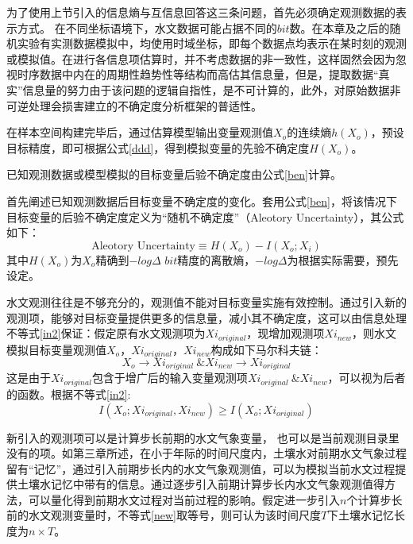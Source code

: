 为了使用上节引入的信息熵与互信息回答这三条问题，首先必须确定观测数据的表示方式。 在不同坐标语境下，水文数据可能占据不同的$bit$数。在本章及之后的随机实验有实测数据模拟中，均使用时域坐标，即每个数据点均表示在某时刻的观测或模拟值。在进行各信息项估算时，并不考虑数据的非一致性，这样固然会因为忽视时序数据中内在的周期性趋势性等结构而高估其信息量，但是，提取数据``真实''信息量的努力由于该问题的逻辑自指性，是不可计算的\cite{li2009introduction}，此外，对原始数据非可逆处理会损害建立的不确定度分析框架的普适性。

在样本空间构建完毕后，通过估算模型输出变量观测值$X_o$的连续熵$h(X_o)$，预设目标精度，即可根据公式\ref{ddd}，得到模拟变量的先验不确定度$H(X_{o})$。


已知观测数据或模型模拟的目标变量后验不确定度由公式\ref{ben}计算。

首先阐述已知观测数据后目标变量不确定度的变化。套用公式\ref{ben}，将该情况下目标变量的后验不确定度定义为``随机不确定度''（Aleotory Uncertainty），其公式如下：
\begin{equation}
\label{aaa}
\text{Aleotory Uncertainty}\equiv H(X_{o})-I(X_{o};X_{i})
\end{equation}
其中$H(X_{o})$为$X_o$精确到$-log\Delta$ $bit$精度的离散熵，$-log\Delta$为根据实际需要，预先设定。

水文观测往往是不够充分的，观测值不能对目标变量实施有效控制。通过引入新的观测项，能够对目标变量提供更多的信息量，减小其不确定度，这可以由信息处理不等式\ref{in2}保证：假定原有水文观测项为$Xi_{original}$，现增加观测项$Xi_{new}$，则水文模拟目标变量观测值$X_o$，$Xi_{original}$，$Xi_{new}$构成如下马尔科夫链：
\begin{equation}
X_o \to Xi_{original} ~\& Xi_{new}\to Xi_{original}
\end{equation}
这是由于$Xi_{original}$包含于增广后的输入变量观测项$Xi_{original} ~\& Xi_{new}$，可以视为后者的函数。根据不等式\ref{in2}:
\begin{equation}
\label{new}
I(X_o;Xi_{original} , Xi_{new})\geq I(X_o;Xi_{original})
\end{equation}

新引入的观测项可以是计算步长前期的水文气象变量， 也可以是当前观测目录里没有的项。如第三章所述，在小于年际的时间尺度内，土壤水对前期水文气象过程留有``记忆''，通过引入前期步长内的水文气象观测值，可以为模拟当前水文过程提供土壤水记忆中带有的信息。通过逐步引入前期计算步长内水文气象观测值得方法，可以量化得到前期水文过程对当前过程的影响。假定进一步引入$n$个计算步长前的水文观测变量时，不等式\ref{new}取等号，则可认为该时间尺度$T$下土壤水记忆长度为$n\times T$。

